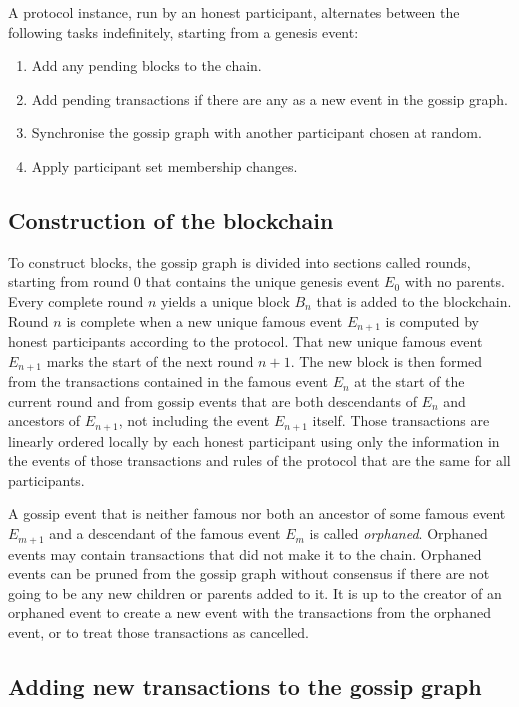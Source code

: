 \documentclass[a4paper,11pt]{article}
\begin{document}
A protocol instance, run by an honest participant, alternates between the following tasks
indefinitely, starting from a genesis event:

\begin{enumerate}
\item Add any pending blocks to the chain.
\item Add pending transactions if there are any as a new event in the gossip graph.
\item Synchronise the gossip graph with another participant chosen at random.
\item Apply participant set membership changes.
\end{enumerate}


\subsection{Construction of the blockchain}

To construct blocks, the gossip graph is divided into sections called rounds, starting from round 0
that contains the unique genesis event $E_0$ with no parents. Every complete round $n$ yields a
unique block $B_n$ that is added to the blockchain. Round $n$ is complete when a new unique famous
event $E_{n+1}$ is computed by honest participants according to the protocol. That new unique famous
event $E_{n+1}$ marks the start of the next round $n + 1$. The new block is then formed from the
transactions contained in the famous event $E_n$ at the start of the current round and from gossip
events that are both descendants of $E_n$ and ancestors of $E_{n+1}$, not including the event
$E_{n+1}$ itself. Those transactions are linearly ordered locally by each honest participant using
only the information in the events of those transactions and rules of the protocol that are the same
for all participants.

A gossip event that is neither famous nor both an ancestor of some famous event $E_{m+1}$ and a
descendant of the famous event $E_m$ is called \emph{orphaned}. Orphaned events may contain
transactions that did not make it to the chain. Orphaned events can be pruned from the gossip graph
without consensus if there are not going to be any new children or parents added to it. It is up to
the creator of an orphaned event to create a new event with the transactions from the orphaned
event, or to treat those transactions as cancelled.


\subsection{Adding new transactions to the gossip graph}
\end{document}
